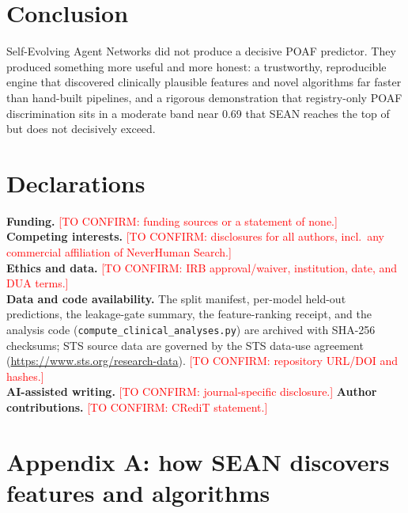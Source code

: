 \documentclass[11pt]{article}
\newcommand{\confirm}[1]{\textcolor{red}{[TO CONFIRM: #1]}}
\newcommand{\sean}{SEAN}
\begin{document}
\section{Conclusion}
Self-Evolving Agent Networks did not produce a decisive POAF predictor. They produced something
more useful and more honest: a trustworthy, reproducible engine that discovered clinically
plausible features and novel algorithms far faster than hand-built pipelines, and a rigorous
demonstration that registry-only POAF discrimination sits in a moderate band near 0.69 that
\sean{} reaches the top of but does not decisively exceed.

\section*{Declarations}
\noindent\textbf{Funding.} \confirm{funding sources or a statement of none.}\\[2pt]
\textbf{Competing interests.} \confirm{disclosures for all authors, incl.\ any commercial
affiliation of NeverHuman Search.}\\[2pt]
\textbf{Ethics and data.} \confirm{IRB approval/waiver, institution, date, and DUA terms.}\\[2pt]
\textbf{Data and code availability.} The split manifest, per-model held-out predictions, the
leakage-gate summary, the feature-ranking receipt, and the analysis code
(\texttt{compute\_clinical\_analyses.py}) are archived with SHA-256 checksums; STS source data
are governed by the STS data-use agreement (\url{https://www.sts.org/research-data}).
\confirm{repository URL/DOI and hashes.}\\[2pt]
\textbf{AI-assisted writing.} \confirm{journal-specific disclosure.}\quad
\textbf{Author contributions.} \confirm{CRediT statement.}

\appendix
\section*{Appendix A: how \sean{} discovers features and algorithms}
\end{document}
